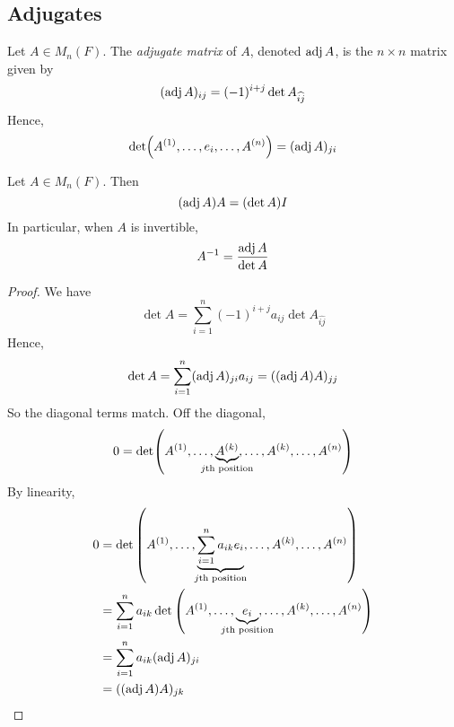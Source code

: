 \subsection{Adjugates}
\begin{definition}
	Let \( A \in M_n(F) \).
	The \textit{adjugate matrix} of \( A \), denoted \( \operatorname{adj} A \), is the \( n \times n \) matrix given by
	\[
		(\operatorname{adj} A)_{ij} = (-1)^{i+j} \det A_{\widehat{ij}}
	\]
	Hence,
	\[
		\det (A^{(1)}, \dots, e_i, \dots, A^{(n)}) = (\operatorname{adj} A)_{ji}
	\]
\end{definition}
\begin{theorem}
	Let \( A \in M_n(F) \).
	Then
	\[
		(\operatorname{adj} A) A = (\det A) I
	\]
	In particular, when \( A \) is invertible,
	\[
		A^{-1} = \frac{\operatorname{adj} A}{\det A}
	\]
\end{theorem}
\begin{proof}
	We have
	\[
		\det A = \sum_{i=1}^n (-1)^{i+j} a_{ij} \det A_{\widehat{ij}}
	\]
	Hence,
	\[
		\det A = \sum_{i=1}^n (\operatorname{adj} A)_{ji} a_{ij} = ((\operatorname{adj} A) A)_{jj}
	\]
	So the diagonal terms match.
	Off the diagonal,
	\[
		0 = \det(A^{(1)}, \dots, \underbrace{A^{(k)}}_{\mathclap{j\text{th position}}}, \dots, A^{(k)}, \dots, A^{(n)})
	\]
	By linearity,
	\begin{align*}
		0 & = \det\qty(A^{(1)}, \dots, \underbrace{\sum_{i=1}^n a_{ik} e_i}_{\mathclap{j\text{th position}}}, \dots, A^{(k)}, \dots, A^{(n)}) \\
		  & = \sum_{i=1}^n a_{ik} \det\qty(A^{(1)}, \dots, \underbrace{e_i}_{\mathclap{j\text{th position}}}, \dots, A^{(k)}, \dots, A^{(n)}) \\
		  & = \sum_{i=1}^n a_{ik} (\adj A)_{ji}                                                                                               \\
		  & = ((\adj A) A)_{jk}
	\end{align*}
\end{proof}
